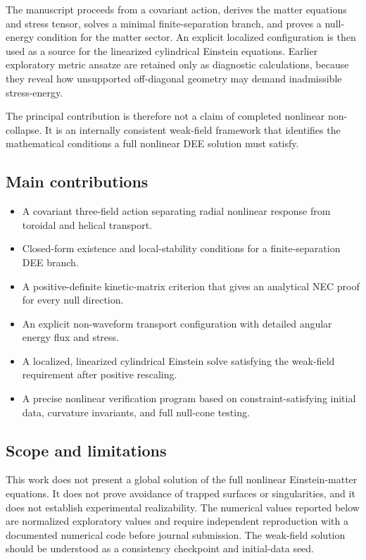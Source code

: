 \documentclass[aps,prd,preprint,nofootinbib,superscriptaddress]{revtex4-2}
\begin{document}
The manuscript proceeds from a covariant action, derives the matter equations and stress tensor, solves a minimal finite-separation branch, and proves a null-energy condition for the matter sector. An explicit localized configuration is then used as a source for the linearized cylindrical Einstein equations. Earlier exploratory metric ansatze are retained only as diagnostic calculations, because they reveal how unsupported off-diagonal geometry may demand inadmissible stress-energy.


The principal contribution is therefore not a claim of completed nonlinear non-collapse. It is an internally consistent weak-field framework that identifies the mathematical conditions a full nonlinear DEE solution must satisfy.


\subsection{Main contributions}

\begin{itemize}

\item A covariant three-field action separating radial nonlinear response from toroidal and helical transport.


\item Closed-form existence and local-stability conditions for a finite-separation DEE branch.


\item A positive-definite kinetic-matrix criterion that gives an analytical NEC proof for every null direction.


\item An explicit non-waveform transport configuration with detailed angular energy flux and stress.


\item A localized, linearized cylindrical Einstein solve satisfying the weak-field requirement after positive rescaling.


\item A precise nonlinear verification program based on constraint-satisfying initial data, curvature invariants, and full null-cone testing.

\end{itemize}
\subsection{Scope and limitations}

This work does not present a global solution of the full nonlinear Einstein-matter equations. It does not prove avoidance of trapped surfaces or singularities, and it does not establish experimental realizability. The numerical values reported below are normalized exploratory values and require independent reproduction with a documented numerical code before journal submission. The weak-field solution should be understood as a consistency checkpoint and initial-data seed.
\end{document}
